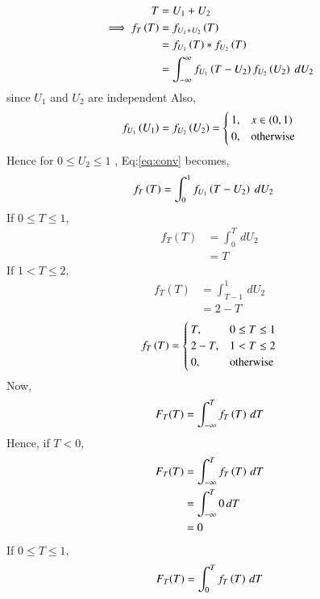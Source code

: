 \documentclass[journal,12pt,twocolumn]{IEEEtran}
\renewcommand\thesection{\arabic{section}}
\begin{document}
\begin{enumerate}[label=\thesection.\arabic*
,ref=\thesection.\theenumi]
\solution
\begin{align}
    T &= U_1 + U_2 \\
    \implies f_T\brak{T} &= f_{U_1 + U_2}\brak{T} \\
                         &= f_{U_1}\brak{T} * f_{U_2}\brak{T} \\
    &= \int_{-\infty}^{\infty}f_{U_1}\brak{T-U_2}f_{U_2}\brak{U_2}\ dU_2  \label{eq:conv}
\end{align}
since $U_1$ and $U_2$ are independent
Also,
\begin{align}  
f_{U_1}\left(U_1\right) = f_{U_2}\left(U_2\right) = 
\begin{cases}
1, & x\in (0,1) \\
0, & \text{otherwise}
\end{cases}
\end{align}
Hence for $0 \leq U_2 \leq 1$ , Eq:\eqref{eq:conv} becomes,
\begin{align}
    f_T\left(T\right) &= \int_{0}^{1}f_{U_1}\left(T-U_2\right)\ dU_2 
\end{align}
If $ 0 \leq T \leq 1 $,
\begin{align}
    f_T(T) &= \int_{0}^{T} \,dU_2  \\
           &= T
\end{align}
If $1 < T \leq 2 $,
\begin{align}
    f_T(T) &= \int_{T-1}^{1} \,dU_2  \\
           &= 2 - T
\end{align}
\begin{align}  
f_{T}\left(T\right) = 
\begin{cases}
T, & 0 \leq T \leq 1 \\
2 - T, & 1 < T \leq 2 \\
0, & \text{otherwise}
\end{cases}
\end{align}
Now,
\begin{equation}
    F_T(T) = \int_{-\infty}^{T} f_{T}\left(T\right) \,dT  \\
\end{equation}
Hence, if $ T < 0 $,
\begin{align}
    F_T(T) &= \int_{-\infty}^{T} f_{T}\left(T\right)\,dT  \\
           &= \int_{-\infty}^{T} 0\,dT  \\
           &= 0
\end{align}
If $ 0 \leq T \leq 1 $,
\begin{align}
    F_T(T) &= \int_{0}^{T} f_{T}\brak{T}\,dT  \\

\end{align}
\end{enumerate}
\end{document}
